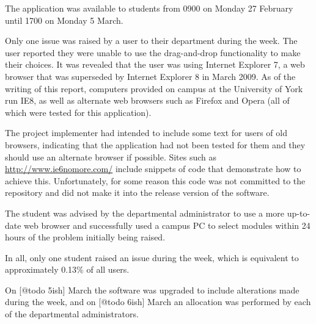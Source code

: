 The application was available to students from 0900 on Monday 27 February
until 1700 on Monday 5 March. %




Only one issue was raised by a user to their department during the week. The
user reported they were unable to use the drag-and-drop functionality to make
their choices. It was revealed that the user was using Internet Explorer 7, a
web browser that was superseded by Internet Explorer 8 in March 2009. As of
the writing of this report, computers provided on campus at the University of
York run IE8, as well as alternate web browsers such as Firefox and Opera (all
of which were tested for this application).

The project implementer had intended to include some text for users of old
browsers, indicating that the application had not been tested for them and
they should use an alternate browser if possible. Sites such as
\url{http://www.ie6nomore.com/} include snippets of code that demonstrate how
to achieve this. Unfortunately, for some reason this code was not committed to
the repository and did not make it into the release version of the software.

The student was advised by the departmental administrator to use a more
up-to-date web browser and successfully used a campus PC to select modules
within 24 hours of the problem initially being raised.

In all, only one student raised an issue during the week, which is equivalent
to approximately 0.13\% of all users.

On [@todo 5ish] March the software was upgraded to include alterations made
during the week, and on [@todo 6ish] March an allocation was performed by each
of the departmental administrators.


